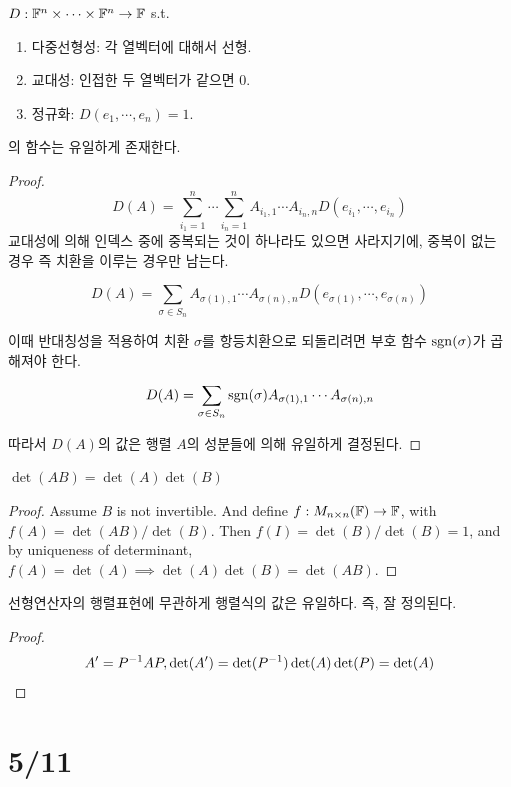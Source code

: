 \documentclass{article}
\begin{document}
\begin{theorem}
    $D: \mathbb{F}^n \times \cdots \times \mathbb{F}^n \to \mathbb{F}$ s.t.
    \begin{enumerate}
        \item 다중선형성: 각 열벡터에 대해서 선형.
        \item 교대성: 인접한 두 열벡터가 같으면 0.
        \item 정규화: $D(e_1, \cdots, e_n)=1$.
    \end{enumerate}
    의 함수는 유일하게 존재한다.
\end{theorem}

\begin{proof}
\[
D(A)=\sum_{i_1=1}^n \cdots \sum_{i_n=1}^n A_{i_1,1}\cdots A_{i_n,n} D(e_{i_1},\cdots,e_{i_n})
\]
교대성에 의해 인덱스 중에 중복되는 것이 하나라도 있으면 사라지기에, 중복이 없는 경우 즉 치환을 이루는 경우만 남는다.

\[
D(A)=\sum_{\sigma \in S_n} A_{\sigma(1),1}\cdots A_{\sigma(n),n} D(e_{\sigma(1)},\cdots,e_{\sigma(n)})
\]

이때 반대칭성을 적용하여 치환 $\sigma$를 항등치환으로 되돌리려면 부호 함수 $\operatorname{sgn}(\sigma)$가 곱해져야 한다.

\[
D(A)=\sum_{\sigma \in S_n} \operatorname{sgn}(\sigma)A_{\sigma(1),1}\cdots A_{\sigma(n),n}
\]

따라서 $D(A)$의 값은 행렬 $A$의 성분들에 의해 유일하게 결정된다.

\end{proof}

\begin{proposition}
    $\det(AB)=\det(A)\det(B)$
\end{proposition}

\begin{proof}
    Assume $B$ is not invertible. And define $f: M_{n \times n}(\mathbb{F}) \to \mathbb{F}$, with $f(A)=\det(AB)/\det(B)$. Then $f(I)=\det(B)/\det(B)=1$, and by uniqueness of determinant, $f(A)=\det(A) \implies \det(A)\det(B)=\det(AB)$.
\end{proof}

\begin{proposition}
    선형연산자의 행렬표현에 무관하게 행렬식의 값은 유일하다. 즉, 잘 정의된다.
\end{proposition}

\begin{proof}
\[
A'=P^{-1} A P, \det(A')=\det(P^{-1})\det(A)\det(P)=\det(A)
\]
\end{proof}

\section*{5/11}
\end{document}
